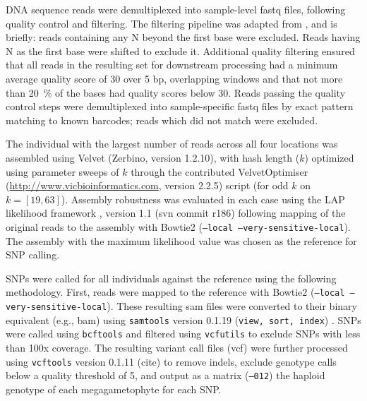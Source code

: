 \documentclass[smallextended]{svjour3}
\begin{document}
DNA sequence reads were demultiplexed into sample-level fastq files, following
quality control and filtering.  The filtering pipeline was adapted from
\citep{Friedline:2012fm}, and is briefly: reads containing any N beyond the
first base were excluded. Reads having N as the first base were shifted to
exclude it.  Additional quality filtering ensured that all reads in the
resulting set for downstream processing had a minimum average quality score of
30 over 5 bp, overlapping windows and that not more than \SI{20}{\percent} of
the bases had quality scores below 30. Reads passing the quality control steps
were demultiplexed into sample-specific fastq files by exact pattern matching to
known barcodes; reads which did not match were excluded.

The individual with the largest number of reads across all four locations was
assembled using Velvet (Zerbino, version 1.2.10), with hash length ($k$)
optimized using parameter sweeps of $k$ through the contributed VelvetOptimiser
(\url{http://www.vicbioinformatics.com}, version 2.2.5) script (for odd $k$ on
$k=[19,63]$).  Assembly robustness was evaluated in each case using the LAP
likelihood framework \citep{Ghodsi:2013bc}, version 1.1 (svn commit r186)
following mapping of the original reads to the assembly with Bowtie2
\citep{Langmead:2012jh} (\texttt{--local --very-sensitive-local}).  The assembly
with the maximum likelihood value was chosen as the reference for SNP calling.

SNPs were called for all individuals against the reference using the following
methodology.  First, reads were mapped to the reference with Bowtie2
(\texttt{--local --very-sensitive-local}).  These resulting sam files were
converted to their binary equivalent (e.g., bam) using \texttt{samtools} version
0.1.19 (\texttt{view, sort, index}) \citep{Li:2009ka}.  SNPs were called using
\texttt{bcftools} and filtered using \texttt{vcfutils} to exclude SNPs with less
than 100x coverage. The resulting variant call files (vcf) were further
processed using \texttt{vcftools} version 0.1.11 (cite) to remove indels,
exclude genotype calls below a quality threshold of 5, and output as a matrix
(\texttt{--012}) the haploid genotype of each megagametophyte for each SNP.
\end{document}

